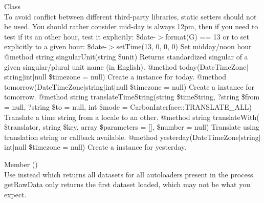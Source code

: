 \begin{DoxyRefList}
\item[Class \doxylink{class_carbon_1_1_factory_immutable}{Carbon\textbackslash{}Factory\+Immutable} ]\hfill \\
\label{deprecated__deprecated000145}%
%
To avoid conflict between different third-\/party libraries, static setters should not be used. You should rather consider mid-\/day is always 12pm, then if you need to test if it\textquotesingle{}s an other hour, test it explicitly\+: \$date-\/\texorpdfstring{$>$}{>}format(\textquotesingle{}G\textquotesingle{}) == 13 or to set explicitly to a given hour\+: \$date-\/\texorpdfstring{$>$}{>}set\+Time(13, 0, 0, 0) Set midday/noon hour @method string singular\+Unit(string \$unit) Returns standardized singular of a given singular/plural unit name (in English). @method  today(Date\+Time\+Zone\texorpdfstring{$\vert$}{|}string\texorpdfstring{$\vert$}{|}int\texorpdfstring{$\vert$}{|}null \$timezone = null) Create a  instance for today. @method  tomorrow(Date\+Time\+Zone\texorpdfstring{$\vert$}{|}string\texorpdfstring{$\vert$}{|}int\texorpdfstring{$\vert$}{|}null \$timezone = null) Create a  instance for tomorrow. @method string translate\+Time\+String(string \$time\+String, ?string \$from = null, ?string \$to = null, int \$mode = Carbon\+Interface\+::\+TRANSLATE\+\_\+\+ALL) Translate a time string from a locale to an other. @method string translate\+With( \$translator, string \$key, array \$parameters = \mbox{[}\mbox{]}, \$number = null) Translate using translation string or callback available. @method  yesterday(Date\+Time\+Zone\texorpdfstring{$\vert$}{|}string\texorpdfstring{$\vert$}{|}int\texorpdfstring{$\vert$}{|}null \$timezone = null) Create a  instance for yesterday. 
\item[Member \doxylink{class_composer_1_1_installed_versions_a1fd2f2e9169766a9a1e937bdaf4b0368}{Composer\textbackslash{}Installed\+Versions\+::get\+Raw\+Data} ()]\hfill \\
\label{deprecated__deprecated000001}%
%
Use  instead which returns all datasets for all autoloaders present in the process. get\+Raw\+Data only returns the first dataset loaded, which may not be what you expect.  

\end{DoxyRefList}
